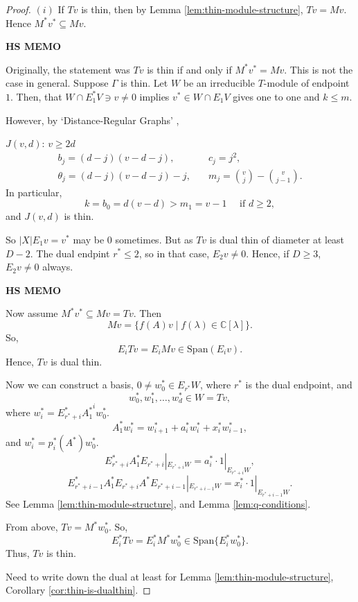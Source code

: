 \documentclass[
]{book}
\theoremstyle{definition}
\theoremstyle{definition}
\theoremstyle{definition}
\theoremstyle{definition}
\theoremstyle{remark}
\begin{document}
\begin{proof}
\leavevmode

\((i)\) If \(Tv\) is thin, then by Lemma \ref{lem:thin-module-structure}, \(Tv = Mv\). Hence \(M^*v^* \subseteq Mv\).

\textbf{HS MEMO}

Originally, the statement was \(Tv\) is thin if and only if \(M^*v^* = Mv\). This is not the case in general. Suppose \(\Gamma\) is thin. Let \(W\) be an irreducible \(T\)-module of endpoint \(1\). Then, that \(W \cap E^*_1V \ni v \neq 0\) implies \(v^*\in W\cap E_1V\) gives one to one and \(k\leq m\).

However, by `Distance-Regular Graphs' \citep{bcn},

\(J(v,d)\): \(v\geq 2d\)
\begin{align}
b_j = (d-j)(v-d-j), & \quad c_j = j^2,\\
\theta_j = (d-j)(v-d-j)-j, & \quad m_j = \binom{v}{j}-\binom{v}{j-1}.
\end{align}
In particular,
\[k = b_0 = d(v-d) > m_1 = v-1 \quad \text{ if }d\geq 2,\]
and \(J(v,d)\) is thin.

So \(|X|E_1v = v^*\) may be \(0\) sometimes. But as \(Tv\) is dual thin of diameter at least \(D-2\). The dual endpint \(r^*\leq 2\), so in that case, \(E_2v \neq 0\). Hence, if \(D\geq 3\), \(E_2v\neq 0\) always.

\textbf{HS MEMO}

Now assume \(M^*v^*\subseteq Mv = Tv\). Then
\[Mv = \{f(A)v\mid f(\lambda)\in \mathbb{C}[\lambda]\}.\]
So,
\[E_iTv = E_iMv \in \mathrm{Span}(E_iv).\]
Hence, \(Tv\) is dual thin.

Now we can construct a basis,
\(0\neq w^*_0\in E_{r^*}W\), where \(r^*\) is the dual endpoint, and
\[w^*_0, w^*_1, \ldots, w^*_d\in W = Tv,\]
where \(w^*_i = E^*_{r^*+i}{A^*_1}^iw^*_0\).
\[A^*_1w^*_i = w^*_{i+1}+ a_i^*w^*_i + x^*_iw^*_{i-1},\]
and \(w^*_i = p^*_i(A^*)w^*_0\).
\[E^*_{r^*+i}A^*_1E_{r^*+i}|_{E_{r^*+i}W} = a^*_i\cdot 1|_{E_{r^*+i}W},\]
\[E^*_{r^*+i-1}A^*_1E_{r^*+i}A^*E_{r^*+i-1}|_{E_{r^*+i-1}W} = x^*_i\cdot 1|_{E_{r^*+i-1}W}.\]
See Lemma \ref{lem:thin-module-structure}, and Lemma \ref{lem:q-conditions}.

From above, \(Tv = M^*w^*_0\). So,
\[E^*_iTv = E^*_iM^*w^*_0 \in \mathrm{Span}\{E^*_iw^*_0\}.\]
Thus, \(Tv\) is thin.

\ast Need to write down the dual at least for Lemma \ref{lem:thin-module-structure}, Corollary \ref{cor:thin-is-dualthin}.


\end{proof}
\end{document}
